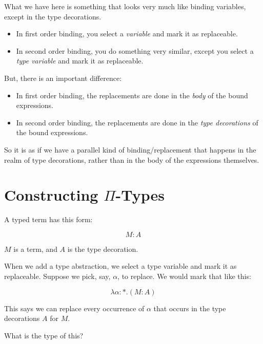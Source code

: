 \documentclass{book}
\numberwithin{equation}{chapter}
\begin{document}
What we have here is something that looks very much like binding variables, except in the type decorations.

\begin{itemize}
\item{In first order binding, you select a \textit{variable} and mark it as replaceable.}
\item{In second order binding, you do something very similar, except you select a \textit{type variable} and mark it as replaceable.}
\end{itemize}

\noindent
But, there is an important difference:

\begin{itemize}
\item{In first order binding, the replacements are done in the \textit{body} of the bound expressions.}
\item{In second order binding, the replacements are done in the \textit{type decorations} of the bound expressions.}
\end{itemize}

\noindent
So it is as if we have a parallel kind of binding/replacement that happens in the realm of type decorations, rather than in the body of the expressions themselves.


\section{Constructing $\Pi$-Types}

A typed term has this form:

\begin{equation}
M : A
\end{equation}

\noindent
$M$ is a term, and $A$ is the type decoration.

When we add a type abstraction, we select a type variable and mark it as replaceable. Suppose we pick, say, $\alpha$, to replace. We would mark that like this:

\begin{equation}
\lambda \alpha : *.(M : A)
\end{equation}

\noindent
This says we can replace every occurrence of $\alpha$ that occurs in the type decorations $A$ for $M$.

What is the type of this?
\end{document}
